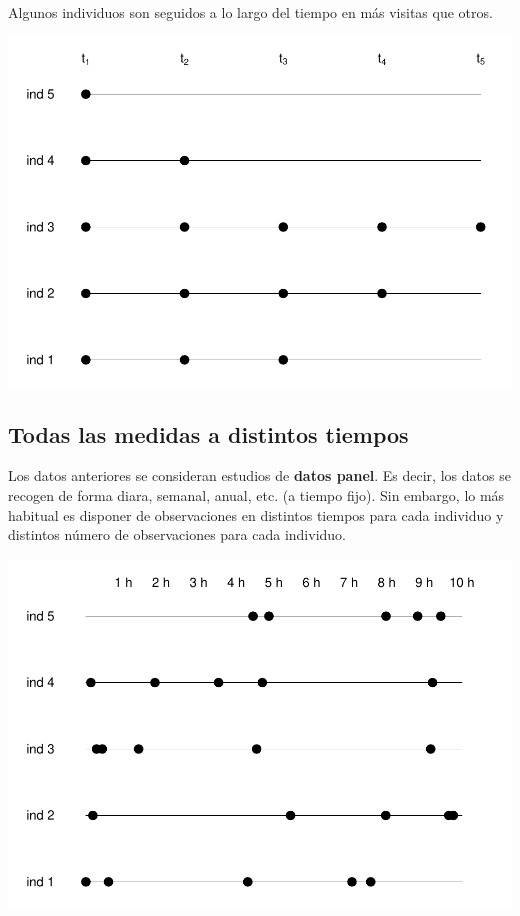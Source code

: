 \documentclass[
]{book}
\begin{document}
Algunos individuos son seguidos a lo largo del tiempo en más visitas que otros.

\includegraphics{fig_out/unnamed-chunk-7-1.pdf}

\hypertarget{todas-las-medidas-a-distintos-tiempos}{%
\subsection{Todas las medidas a distintos tiempos}\label{todas-las-medidas-a-distintos-tiempos}}

Los datos anteriores se consideran estudios de \textbf{datos panel}. Es decir, los datos se recogen de forma diara, semanal, anual, etc. (a tiempo fijo). Sin embargo, lo más habitual es disponer de observaciones en distintos tiempos para cada individuo y distintos número de observaciones para cada individuo.

\includegraphics{fig_out/unnamed-chunk-8-1.pdf}
\end{document}
